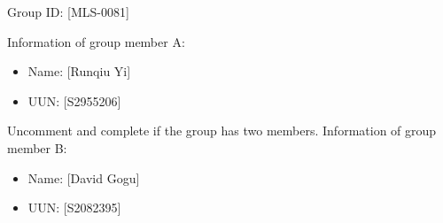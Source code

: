 Group ID: [MLS-0081]

Information of group member A:
\begin{itemize}
    \item Name: [Runqiu Yi]
    \item UUN: [S2955206]
\end{itemize}

Uncomment and complete if the group has two members.
Information of group member B:
\begin{itemize}
    \item Name: [David Gogu]
    \item UUN: [S2082395]
\end{itemize}

